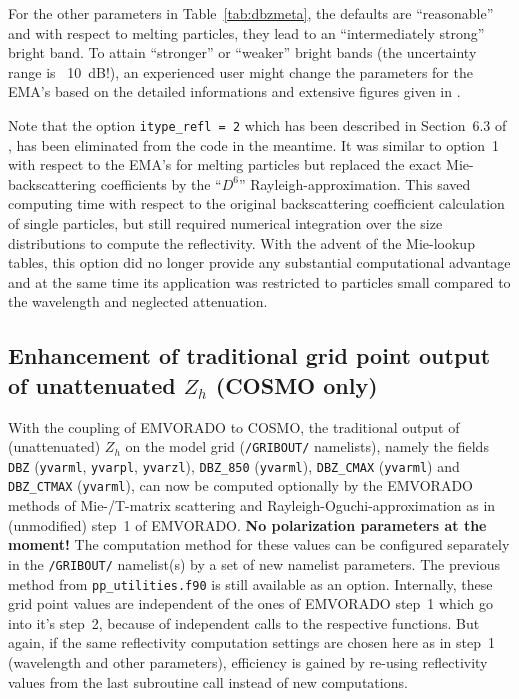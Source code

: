 \documentclass[10pt,a4paper,twoside,headinclude,footinclude,parskip=half]{scrartcl}
\newcommand{\myaktuellesection}{sec:intro}%
\newcommand{\labelsec}[1]{\label{#1}\renewcommand{\myaktuellesection}{#1}}%
\newcommand{\labelsec}[1]{\label{#1}}%
\newcommand{\citeP}[1]{\citet{#1}}
\newcommand{\srcform}[1]{\mbox{\texttt{#1}}\xspace}%
\begin{document}
For the other parameters in Table~\ref{tab:dbzmeta}, the defaults are ``reasonable'' and with respect to melting particles, they lead to an ``intermediately strong'' bright band.
To attain ``stronger'' or ``weaker'' bright bands (the uncertainty range is ~10~dB!), an experienced user might change the parameters for the EMA's based on
the detailed informations and extensive figures given in \citeP{blahak2016a}.

Note that the option \srcform{itype_refl = 2} which has been described in Section~6.3 of \citeP{blahak2016a}, has been eliminated from the code in the meantime.
It was similar to option~1 with respect to the EMA's for melting particles but replaced the exact Mie-backscattering coefficients by the ``$D^6$'' Rayleigh-approximation.
This saved computing time with respect to the original backscattering coefficient calculation of single particles, but still required numerical integration over the size distributions to
compute the reflectivity. With the advent of the Mie-lookup tables, this option did no longer provide any substantial computational advantage and at the same time
its application was restricted to particles small compared to the wavelength and neglected attenuation.


\subsection{Enhancement of traditional grid point output of unattenuated $Z_h$ (COSMO only)}

\labelsec{sec:intro:gpout}

With the coupling of EMVORADO to COSMO, the traditional output of (unattenuated) $Z_h$ on the model grid (\srcform{/GRIBOUT/} namelists), namely the fields
\srcform{DBZ} (\srcform{yvarml}, \srcform{yvarpl}, \srcform{yvarzl}), \srcform{DBZ_850} (\srcform{yvarml}), \srcform{DBZ_CMAX} (\srcform{yvarml}) and \srcform{DBZ_CTMAX} (\srcform{yvarml}),
can now be computed optionally by the EMVORADO methods of Mie-/T-matrix scattering and Rayleigh-Oguchi-approximation as in (unmodified) step~1 of EMVORADO. \textbf{No polarization parameters at the moment!}
The computation method for these values can be
configured separately in the \srcform{/GRIBOUT/} namelist(s) by a set of new namelist parameters. The previous method from \srcform{pp_utilities.f90} is still available as an option.
Internally, these grid point values are independent of the ones of EMVORADO step~1 which go into it's step~2, because of independent calls to the
respective functions.
But again, if the same reflectivity computation settings are chosen here as in
step~1 (wavelength and other parameters), efficiency is gained by re-using reflectivity values from the last subroutine call instead of new computations.
\end{document}
